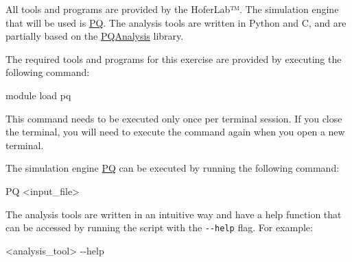 \documentclass[
  letterpaper,
]{article}
\newenvironment{Shaded}{\begin{snugshade}}{\end{snugshade}}
\newcommand{\ExtensionTok}[1]{\textcolor[rgb]{0.00,0.23,0.31}{#1}}
\newcommand{\NormalTok}[1]{\textcolor[rgb]{0.00,0.23,0.31}{#1}}
\newcommand{\OperatorTok}[1]{\textcolor[rgb]{0.37,0.37,0.37}{#1}}
\begin{document}
All tools and programs are provided by the HoferLab™. The simulation
engine that will be used is \href{https://github.com/MolarVerse/PQ}{PQ}.
The analysis tools are written in Python and C, and are partially based
on the \href{https://github.com/MolarVerse/PQAnalysis}{PQAnalysis}
library.

The required tools and programs for this exercise are provided by
executing the following command:

\begin{Shaded}
\begin{Highlighting}[]
\ExtensionTok{module}\NormalTok{ load pq}
\end{Highlighting}
\end{Shaded}

\begin{tcolorbox}[enhanced jigsaw, toptitle=1mm, opacitybacktitle=0.6, colframe=quarto-callout-important-color-frame, toprule=.15mm, breakable, bottomrule=.15mm, left=2mm, title=\textcolor{quarto-callout-important-color}{\faExclamation}\hspace{0.5em}{Important}, titlerule=0mm, leftrule=.75mm, bottomtitle=1mm, coltitle=black, arc=.35mm, rightrule=.15mm, opacityback=0, colback=white, colbacktitle=quarto-callout-important-color!10!white]

This command needs to be executed only once per terminal session. If you
close the terminal, you will need to execute the command again when you
open a new terminal.

\end{tcolorbox}

The simulation engine \href{https://github.com/MolarVerse/PQ}{PQ} can be
executed by running the following command:

\begin{Shaded}
\begin{Highlighting}[]
\ExtensionTok{PQ} \OperatorTok{\textless{}}\NormalTok{input\_file}\OperatorTok{\textgreater{}}
\end{Highlighting}
\end{Shaded}

The analysis tools are written in an intuitive way and have a help
function that can be accessed by running the script with the
\texttt{-\/-help} flag. For example:

\begin{Shaded}
\begin{Highlighting}[]
\OperatorTok{\textless{}}\NormalTok{analysis\_tool}\OperatorTok{\textgreater{}}\NormalTok{ {-}{-}help}
\end{Highlighting}
\end{Shaded}
\end{document}
